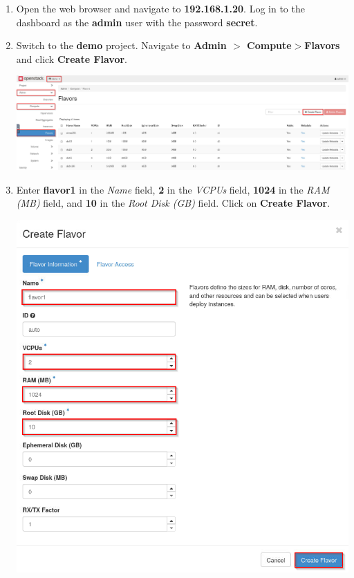 \documentclass[letterpaper, 12pt]{article}
\begin{document}
\begin{enumerate}
    \item Open the web browser and navigate to \textbf{192.168.1.20}. Log in to the dashboard as the \textbf{admin} user
    with the password \textbf{secret}.
    
    \item Switch to the \textbf{demo} project. Navigate to \textbf{Admin $>$ Compute$>$Flavors} and click
    \textbf{Create Flavor}.

    \begin{center}
        \includegraphics[width=\linewidth]{images/part2/step2.png}
    \end{center}

    \item Enter \textbf{flavor1} in the \textit{Name} field, \textbf{2} in the \textit{VCPUs} field, \textbf{1024} in
    the \textit{RAM (MB)} field, and \textbf{10} in the \textit{Root Disk (GB)} field. Click on \textbf{Create Flavor}.

    \begin{center}
        \includegraphics[width=\linewidth]{images/part2/step3.png}
    \end{center}


\end{enumerate}
\end{document}
